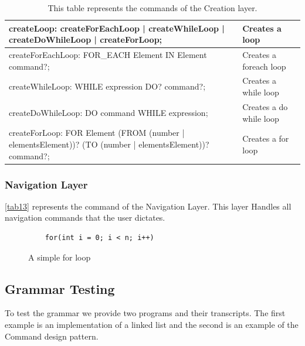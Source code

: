\begin{table}[H]
\begin{tabular}{|p{10cm}|l|}
createLoop: createForEachLoop | createWhileLoop | createDoWhileLoop | createForLoop;                                                                    & Creates a loop                         \\ \hline
createForEachLoop: FOR\_EACH Element IN Element command?;                                                                                               & Creates a foreach loop                 \\ \hline
createWhileLoop: WHILE expression DO? command?;                                                                                                         & Creates a while loop                   \\ \hline
createDoWhileLoop: DO command WHILE expression;                                                                                                         & Creates a do while loop                \\ \hline
createForLoop: FOR Element (FROM (number | elementsElement))? (TO (number | elementsElement))? command?;                                                & Creates a for loop                     \\ \hline
\end{tabular}
\caption{This table represents the commands of the Creation layer.}
\label{tab12}
\end{table}
\subsubsection{Navigation Layer}
\autoref{tab13} represents the command of the Navigation Layer.  This layer Handles all navigation commands that the user dictates.



\begin{figure}[H]
	\begin{lstlisting}
	for(int i = 0; i < n; i++)
	\end{lstlisting}
	\caption{A simple for loop}
	\label{fig20}
\end{figure}

\subsection{Grammar Testing} \label{subsection: Grammar Testing}
To test the grammar we provide two programs and their transcripts. The first example is an implementation of a linked list and the second is an example of the Command design pattern. 
